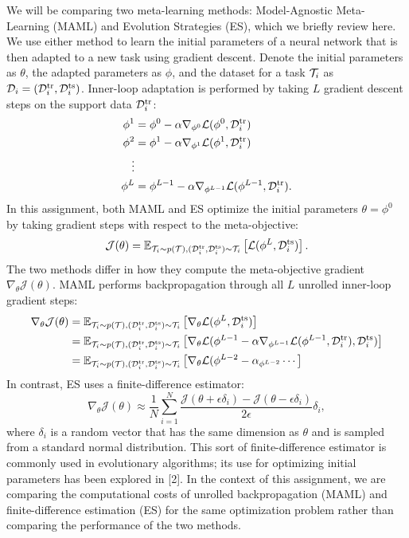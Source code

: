 \documentclass[12pt]{article}
\begin{document}
We will be comparing two meta-learning methods: Model-Agnostic Meta-Learning (MAML) and Evolution Strategies (ES), which we briefly review here.
We use either method to learn the initial parameters of a neural network that is then adapted to a new task using gradient descent.
Denote the initial parameters as $\theta$, the adapted parameters as $\phi$, and the dataset for a task $\mathcal{T}_i$ as $\mathcal{D}_i = (\mathcal{D}^\mathrm{tr}_i, \mathcal{D}^\mathrm{ts}_i)$.
Inner-loop adaptation is performed by taking $L$ gradient descent steps on the support data $\mathcal{D}^\mathrm{tr}_i$:
\begin{align}
    \phi^1 &= \phi^0 - \alpha \nabla_{\phi^0} \mathcal{L}(\phi^0, \mathcal{D}^\mathrm{tr}_i) \nonumber \\
    \phi^2 &= \phi^1 - \alpha \nabla_{\phi^1} \mathcal{L}(\phi^1, \mathcal{D}^\mathrm{tr}_i) \nonumber \\
    \vdots \nonumber \\
    \phi^L &= \phi^{L-1} - \alpha \nabla_{\phi^{L-1}} \mathcal{L}(\phi^{L-1}, \mathcal{D}^\mathrm{tr}_i).
\end{align}
In this assignment, both MAML and ES optimize the initial parameters $\theta=\phi^0$ by taking gradient steps with respect to the meta-objective:
\begin{equation}
    \mathcal{J}(\theta) = \mathbb{E}_{\mathcal{T}_i \sim p(\mathcal{T}), (\mathcal{D}^\mathrm{tr}_i, \mathcal{D}^\mathrm{ts}_i) \sim \mathcal{T}_i} \left[ \mathcal{L}(\phi^L, \mathcal{D}^\mathrm{ts}_i) \right].
\end{equation}
The two methods differ in how they compute the meta-objective gradient $\nabla_\theta \mathcal{J}(\theta)$.
MAML performs backpropagation through all $L$ unrolled inner-loop gradient steps: 
\begin{align}
  \nabla_\theta \mathcal{J}(\theta) 
  &= \mathbb{E}_{\mathcal{T}_i \sim p(\mathcal{T}), (\mathcal{D}^\mathrm{tr}_i, \mathcal{D}^\mathrm{ts}_i) \sim \mathcal{T}_i} \left[ \nabla_\theta \mathcal{L}(\phi^L, \mathcal{D}^\mathrm{ts}_i) \right] \nonumber \\
  &= \mathbb{E}_{\mathcal{T}_i \sim p(\mathcal{T}), (\mathcal{D}^\mathrm{tr}_i, \mathcal{D}^\mathrm{ts}_i) \sim \mathcal{T}_i} \left[ \nabla_\theta \mathcal{L}(\phi^{L-1} - \alpha \nabla_{\phi^{L-1}} \mathcal{L}(\phi^{L-1}, \mathcal{D}^\mathrm{tr}_i), \mathcal{D}^\mathrm{ts}_i) \right] \nonumber \\
  &= \mathbb{E}_{\mathcal{T}_i \sim p(\mathcal{T}), (\mathcal{D}^\mathrm{tr}_i, \mathcal{D}^\mathrm{ts}_i) \sim \mathcal{T}_i} \left[ \nabla_\theta \mathcal{L}(\phi^{L-2} - \alpha_{\phi^{L-2}} \cdots \right]
\end{align}
In contrast, ES uses a finite-difference estimator:
\begin{equation}
    \nabla_\theta \mathcal{J}(\theta) \approx \frac{1}{N} \sum_{i=1}^N \frac{\mathcal{J}(\theta + \epsilon \delta_i) - \mathcal{J}(\theta - \epsilon \delta_i)}{2 \epsilon} \delta_i,
\end{equation}
where $\delta_i$ is a random vector that has the same dimension as $\theta$ and is sampled from a standard normal distribution.
This sort of finite-difference estimator is commonly used in evolutionary algorithms; its use for optimizing initial parameters has been explored in [2].
In the context of this assignment, we are comparing the computational costs of unrolled backpropagation (MAML) and finite-difference estimation (ES) for the same optimization problem rather than comparing the performance of the two methods.
\end{document}
